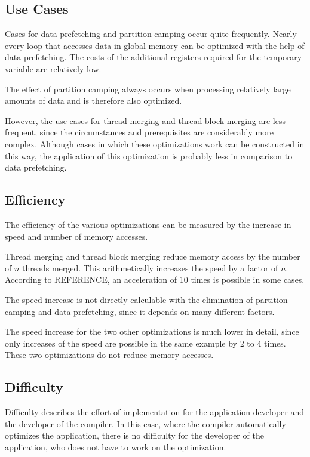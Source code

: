 \documentclass[conference]{IEEEtran}
\begin{document}
	
	\subsection{Use Cases}
		Cases for data prefetching and partition camping occur quite frequently. Nearly every loop that accesses data in global memory can be optimized with the help of data prefetching.  The costs of the additional registers required for the temporary variable are relatively low.
		
		The effect of partition camping always occurs when processing relatively large amounts of data and is therefore also optimized.
		
		However, the use cases for thread merging and thread block merging are less frequent, since the circumstances and prerequisites are considerably more complex. Although cases in which these optimizations work can be constructed in this way, the application of this optimization is probably less in comparison to data prefetching.
		
	\subsection{Efficiency}
		The efficiency of the various optimizations can be measured by the increase in speed and number of memory accesses.
		
		Thread merging and thread block merging reduce memory access by the number of $n$ threads merged. This arithmetically increases the speed by a factor of $n$. According to REFERENCE, an acceleration of 10 times is possible in some cases.
		
		The speed increase is not directly calculable with the elimination of partition camping and data prefetching, since it depends on many different factors.
		
		The speed increase for the two other optimizations is much lower in detail, since only increases of the speed are possible in the same example by 2 to 4 times. These two optimizations do not reduce memory accesses.
		
		
	\subsection{Difficulty}
		
		Difficulty describes the effort of implementation for the application developer and the developer of the compiler. In this case, where the compiler automatically optimizes the application, there is no difficulty for the developer of the application, who does not have to work on the optimization.
\end{document}
